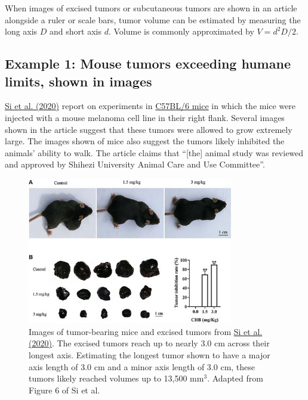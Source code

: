 \documentclass[letterpaper, 12pt]{article}
\begin{document}
When images of excised tumors or subcutaneous tumors are shown in an article alongside a ruler or scale bars, tumor volume can be estimated by measuring the long axis $D$ and short axis $d$. Volume is commonly approximated by $V = d^2D/2$.

\pagebreak

\subsection*{Example 1: Mouse tumors exceeding humane limits, shown in images}

\href{https://doi.org/10.3389/fonc.2020.00415}{Si et al. (2020)} report on experiments in \href{https://en.wikipedia.org/wiki/C57BL/6}{C57BL/6 mice} in which the mice were injected with a mouse melanoma cell line in their right flank. Several images shown in the article suggest that these tumors were allowed to grow extremely large. The images shown of mice also suggest the tumors likely inhibited the animals' ability to walk. The article claims that ``[the] animal study was reviewed and approved by Shihezi University Animal Care and Use Committee''.

\begin{figure}[h!tbp]
    \centering
    \includegraphics[width=0.8\textwidth]{img/tumor_burden/Screenshot 2025-04-04 at 15-23-31 fonc-10-00415-g006.png}
    \caption*{Images of tumor-bearing mice and excised tumors from \href{https://doi.org/10.3389/fonc.2020.00415}{Si et al. (2020)}. The excised tumors reach up to nearly 3.0 cm across their longest axis. Estimating the longest tumor shown to have a major axis length of 3.0 cm and a minor axis length of 3.0 cm, these tumors likely reached volumes up to 13,500 mm$^3$. Adapted from Figure 6 of Si et al.}
\end{figure}
\end{document}
